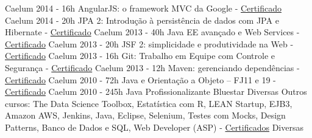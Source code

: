 \begin{entrylistii}
    {Caelum}  
  \entryii
    {2014 - 16h}
    {AngularJS: o framework MVC da Google - \href{https://www.alura.com.br/user/3311/fullCertificate/bdd8817990ef209f0fb6b049f2d2ea0c}{Certificado}}
    {Caelum}
  \entryii
    {2014 - 20h}
    {JPA 2: Introdução à persistência de dados com JPA e Hibernate - \href{https://www.alura.com.br/user/3311/fullCertificate/bdd8817990ef209f0fb6b049f2d2ea0c}{Certificado}}
    {Caelum}
  \entryii
    {2013 - 40h}
    {Java EE avançado e Web Services - \href{https://www.alura.com.br/user/3311/fullCertificate/bdd8817990ef209f0fb6b049f2d2ea0c}{Certificado}}
    {Caelum}
  \entryii
    {2013 - 20h}
    {JSF 2: simplicidade e produtividade na Web - \href{https://www.alura.com.br/user/3311/fullCertificate/bdd8817990ef209f0fb6b049f2d2ea0c}{Certificado}}
    {Caelum}
  \entryii
    {2013 - 16h}
    {Git: Trabalho em Equipe com Controle e Segurança - \href{https://www.alura.com.br/user/3311/fullCertificate/bdd8817990ef209f0fb6b049f2d2ea0c}{Certificado}}
    {Caelum}
  \entryii
    {2013 - 12h}
    {Maven: gerenciando dependências - \href{https://www.alura.com.br/user/3311/fullCertificate/bdd8817990ef209f0fb6b049f2d2ea0c}{Certificado}}
    {Caelum}
  \entryii
    {2010 - 72h}
    {Java e Orientação a Objeto – FJ11 e 19 - \href{https://www.alura.com.br/user/3311/fullCertificate/bdd8817990ef209f0fb6b049f2d2ea0c}{Certificado}}
    {Caelum}
  \entryii
    {2010 - 245h}
    {Java Profissionalizante}
    {Bluestar}
  \entryii
    {Diversas}
    {Outros cursos: The Data Science Toolbox, Estatística com R, LEAN Startup, EJB3, Amazon AWS, Jenkins, Java, Eclipse, Selenium, Testes com Mocks, Design Patterns, Banco de Dados e SQL, Web Developer (ASP) - \href{https://www.alura.com
    .br/user/3311/fullCertificate/bdd8817990ef209f0fb6b049f2d2ea0c}{Certificados}}
    {Diversas}
\end{entrylistii}

